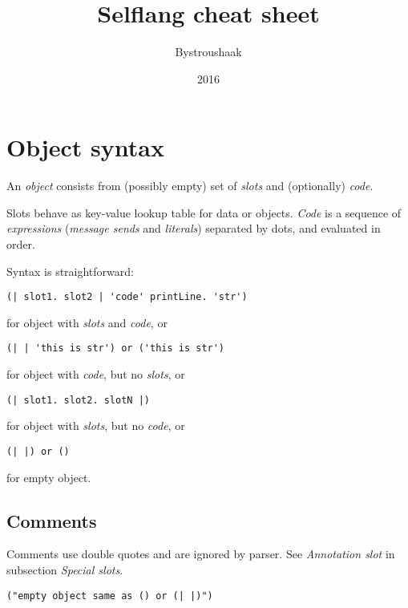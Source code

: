 \documentclass[10pt]{article}
\title{Selflang cheat sheet}
\author{Bystroushaak}
\date{2016}
\renewcommand{\maketitle}{
    {\begin{center}\Large \mythetitle\end{center}}
}
\begin{document}
\begin{multicols*}{3}
\maketitle

\section{Object syntax}

An \textit{object} consists from (possibly empty) set of \textit{slots} and (optionally) \textit{code}.

Slots behave as key-value lookup table for data or objects. \textit{Code} is a sequence of \textit{expressions} (\textit{message sends} and \textit{literals}) separated by dots, and evaluated in order.

Syntax is straightforward:

\begin{lstlisting}
(| slot1. slot2 | 'code' printLine. 'str')
\end{lstlisting}

for object with \textit{slots} and \textit{code}, or

\begin{lstlisting}
(| | 'this is str') or ('this is str')
\end{lstlisting}

for object with \textit{code}, but no \textit{slots}, or

\begin{lstlisting}
(| slot1. slot2. slotN |)
\end{lstlisting}

for object with \textit{slots}, but no \textit{code}, or

\begin{lstlisting}
(| |) or ()
\end{lstlisting}

for empty object.



\subsection{Comments}

Comments use double quotes and are ignored by parser. See \textit{Annotation slot} in subsection \textit{Special slots}.

\begin{lstlisting}
("empty object same as () or (| |)")
\end{lstlisting}





\end{multicols*}
\end{document}
